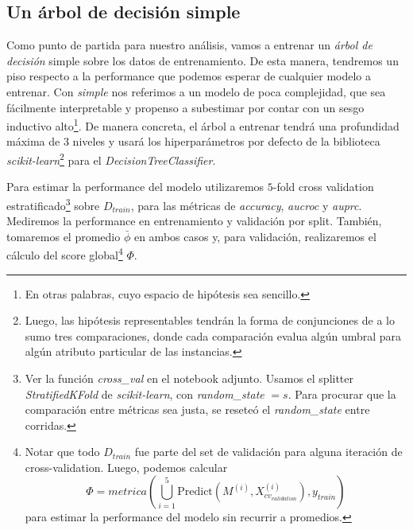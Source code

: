 \subsection{Un árbol de decisión simple}\label{simple}

Como punto de partida para nuestro análisis, vamos a entrenar un \textit{árbol de decisión} simple sobre los datos de entrenamiento. De esta manera, tendremos un piso respecto a la performance que podemos esperar de cualquier modelo a entrenar. Con \textit{simple} nos referimos a un modelo de poca complejidad, que sea fácilmente interpretable y propenso a subestimar por contar con un sesgo inductivo alto\footnote{En otras palabras, cuyo espacio de hipótesis sea sencillo.}. De manera concreta, el árbol a entrenar tendrá una profundidad máxima de $3$ niveles y usará los hiperparámetros por defecto de la biblioteca \textit{scikit-learn}\footnote{Luego, las hipótesis representables tendrán la forma de conjunciones de a lo sumo tres comparaciones, donde cada comparación evalua algún umbral para algún atributo particular de las instancias.} para el \textit{DecisionTreeClassifier}.

Para estimar la performance del modelo utilizaremos $5$-fold cross validation estratificado\footnote{Ver la función \textit{cross\_val} en el notebook adjunto. Usamos el splitter \textit{StratifiedKFold} de \textit{scikit-learn}, con \textit{random\_state} $= s$. Para procurar que la comparación entre métricas sea justa, se reseteó el \textit{random\_state} entre corridas.} sobre $D_{train}$, para las métricas de \textit{accuracy}, \textit{aucroc} y \textit{auprc}. Mediremos la performance en entrenamiento y validación por split. También, tomaremos el promedio $\bar\phi$ en ambos casos y, para validación, realizaremos el cálculo del score global\footnote{Notar que todo $D_{train}$ fue parte del set de validación para alguna iteración de cross-validation. Luego, podemos calcular $$\Phi = metrica(\bigcup_{i=1}^5\text{Predict}(M^{(i)}, X_{cv_{validation}}^{(i)}), y_{train})$$ para estimar la performance del modelo sin recurrir a promedios.} $\Phi$.

